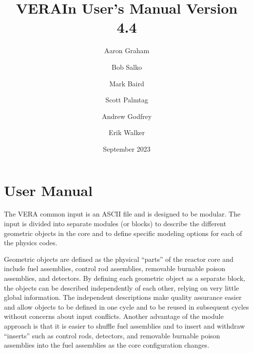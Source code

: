 \documentclass{vera-ornltm}
\author[1]{Aaron Graham}
\author[1]{Bob Salko}
\author[1]{Mark Baird}
\author[2]{Scott Palmtag}
\author[3]{Andrew Godfrey}
\author[4]{Erik Walker}
\affil[1]{Oak Ridge National Laboratory}
\affil[2]{North Carolina State University}
\affil[3]{Veracity Nuclear, LLC.}
\affil[4]{Last Energy}
\title{VERAIn User's Manual Version 4.4}
\date{September 2023}
\renewcommand{\marginpar}[1]{{\small\em\color{note}[#1]}}
\begin{document}
\frontmatter



\tableofcontents
\listoffigures
\printacronyms[title=ABBREVIATIONS]
\setcounter{table}{0}

\mainmatter



\clearpage
\section{User Manual}
\label{chap:user}

The VERA common input is an ASCII file and is designed to be modular.
The input is divided into separate modules
(or blocks) to describe the different geometric objects in the core and
to define specific modeling options for each of the physics codes.

Geometric objects are defined as the physical ``parts'' of the reactor core and include
fuel assemblies, control rod assemblies, removable burnable poison assemblies, and detectors.
By defining each geometric object as a separate block, the objects can be described
independently of each other, relying on very little global information. The independent
descriptions make quality assurance easier and allow objects to be defined in one cycle
and to be reused in subsequent cycles without concerns about input conflicts.
Another advantage of the module approach is that it is easier to shuffle fuel assemblies
and to insert and withdraw ``inserts'' such as control rods, detectors, and removable burnable
poison assemblies into the fuel assemblies as the core configuration changes.
\end{document}
